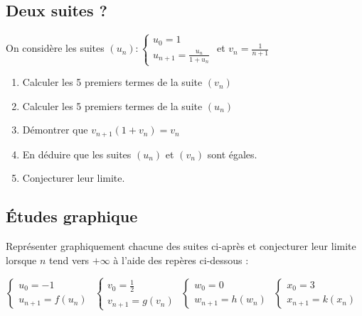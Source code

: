 \documentclass[oneside,12pt]{book}          %
\begin{document}
\subsection{Deux suites ?}
On considère les suites $(u_n):\begin{cases}u_0=1\\u_{n+1}=\frac{u_n}{1+u_n}\end{cases}$ et $v_n=\frac{1}{n+1}$

\begin{enumerate}
	\item Calculer les 5 premiers termes de la suite $(v_n)$
	\item Calculer les 5 premiers termes de la suite $(u_n)$
	\item Démontrer que $v_{n+1}(1+v_n)=v_n$
	\item En déduire que les suites $(u_n)$ et $(v_n)$ sont égales.
	\item Conjecturer leur limite.
\end{enumerate}


\subsection{Études graphique}
Représenter graphiquement chacune des suites ci-après et conjecturer leur limite lorsque $n$ tend vers $+\infty$ à l'aide des repères ci-dessous :

$\begin{cases}u_0=-1\\u_{n+1}=f(u_n)\end{cases}$ \qquad
$\begin{cases}v_0=\frac{1}{2}\\v_{n+1}=g(v_n)\end{cases}$ \qquad
$\begin{cases}w_0=0\\w_{n+1}=h(w_n)\end{cases}$ \qquad
$\begin{cases}x_0=3\\x_{n+1}=k(x_n)\end{cases}$
\end{document}
